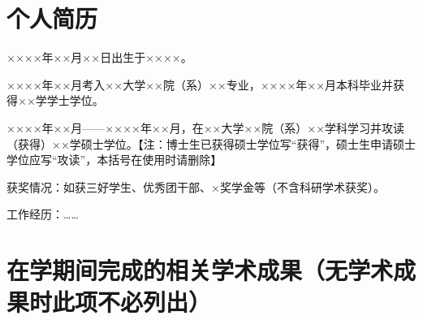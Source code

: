 
\begin{resume}

  \section*{个人简历} %

  ××××年××月××日出生于××××。

  ××××年××月考入××大学××院（系）××专业，××××年××月本科毕业并获得××学学士学位。

  ××××年××月——××××年××月，在××大学××院（系）××学科学习并攻读（获得）××学硕士学位。【注：博士生已获得硕士学位写“获得”，硕士生申请硕士学位应写“攻读”，本括号在使用时请删除】

  获奖情况：如获三好学生、优秀团干部、×奖学金等（不含科研学术获奖）。

  工作经历：……







  \section*{在学期间完成的相关学术成果（无学术成果时此项不必列出）}


\end{resume}
